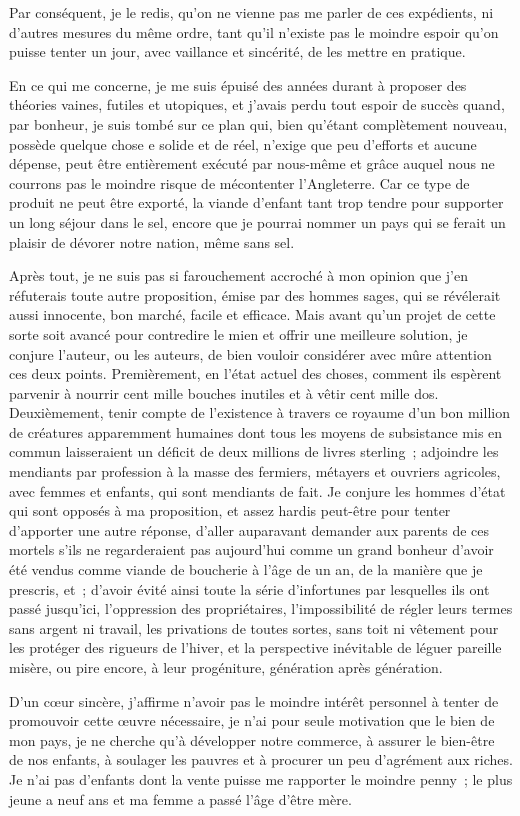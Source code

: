 \documentclass[french,twoside]{book} %
\begin{document}
Par conséquent, je le redis, qu’on ne vienne pas me parler de ces expédients, ni d’autres mesures du même ordre, tant qu’il n’existe pas le moindre espoir qu’on puisse tenter un jour, avec vaillance et sincérité, de les mettre en pratique.\par
En ce qui me concerne, je me suis épuisé des années durant à proposer des théories vaines, futiles et utopiques, et j’avais perdu tout espoir de succès quand, par bonheur, je suis tombé sur ce plan qui, bien qu’étant complètement nouveau, possède quelque chose e solide et de réel, n’exige que peu d’efforts et aucune dépense, peut être entièrement exécuté par nous-même et grâce auquel nous ne courrons pas le moindre risque de mécontenter l’Angleterre. Car ce type de produit ne peut être exporté, la viande d’enfant tant trop tendre pour supporter un long séjour dans le sel, encore que je pourrai nommer un pays qui se ferait un plaisir de dévorer notre nation, même sans sel.\par
Après tout, je ne suis pas si farouchement accroché à mon opinion que j’en réfuterais toute autre proposition, émise par des hommes sages, qui se révélerait aussi innocente, bon marché, facile et efficace. Mais avant qu’un projet de cette sorte soit avancé pour contredire le mien et offrir une meilleure solution, je conjure l’auteur, ou les auteurs, de bien vouloir considérer avec mûre attention ces deux points. Premièrement, en l’état actuel des choses, comment ils espèrent parvenir à nourrir cent mille bouches inutiles et à vêtir cent mille dos. Deuxièmement, tenir compte de l’existence à travers ce royaume d’un bon million de créatures apparemment humaines dont tous les moyens de subsistance mis en commun laisseraient un déficit de deux millions de livres sterling ; adjoindre les mendiants par profession à la masse des fermiers, métayers et ouvriers agricoles, avec femmes et enfants, qui sont mendiants de fait. Je conjure les hommes d’état qui sont opposés à ma proposition, et assez hardis peut-être pour tenter d’apporter une autre réponse, d’aller auparavant demander aux parents de ces mortels s’ils ne regarderaient pas aujourd’hui comme un grand bonheur d’avoir été vendus comme viande de boucherie à l’âge de un an, de la manière que je prescris, et ; d’avoir évité ainsi toute la série d’infortunes par lesquelles ils ont passé jusqu’ici, l’oppression des propriétaires, l’impossibilité de régler leurs termes sans argent ni travail, les privations de toutes sortes, sans toit ni vêtement pour les protéger des rigueurs de l’hiver, et la perspective inévitable de léguer pareille misère, ou pire encore, à leur progéniture, génération après génération.\par
D’un cœur sincère, j’affirme n’avoir pas le moindre intérêt personnel à tenter de promouvoir cette œuvre nécessaire, je n’ai pour seule motivation que le bien de mon pays, je ne cherche qu’à développer notre commerce, à assurer le bien-être de nos enfants, à soulager les pauvres et à procurer un peu d’agrément aux riches. Je n’ai pas d’enfants dont la vente puisse me rapporter le moindre penny ; le plus jeune a neuf ans et ma femme a passé l’âge d’être mère.
 
\end{document}

